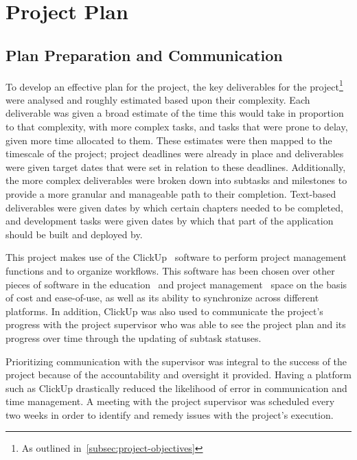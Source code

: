 
\thispagestyle{plain}
\newpage
\section{Project Plan}\label{sec:project-plan}

\normalsize

\subsection{Plan Preparation and Communication}\label{subsec:plan-preparation-and-communication}

To develop an effective plan for the project, the key deliverables for the project\footnote{As outlined in~\ref{subsec:project-objectives}} were analysed and roughly estimated based upon their complexity.
Each deliverable was given a broad estimate of the time this would take in proportion to that complexity, with more complex tasks, and tasks that were prone to delay, given more time allocated to them.
These estimates were then mapped to the timescale of the project;
project deadlines were already in place and deliverables were given target dates that were set in relation to these deadlines.
Additionally, the more complex deliverables were broken down into subtasks and milestones to provide a more granular and manageable path to their completion.
Text-based deliverables were given dates by which certain chapters needed to be completed, and development tasks were given dates by which that part of the application should be built and deployed by.

This project makes use of the ClickUp~\citep{clickup} software to perform project management functions and to organize workflows.
This software has been chosen over other pieces of software in the education~\citep{education_software} and project management~\citep{pm_software} space on the basis of cost and ease-of-use, as well as its ability to synchronize across different platforms.
In addition, ClickUp was also used to communicate the project's progress with the project supervisor who was able to see the project plan and its progress over time through the updating of subtask statuses.

Prioritizing communication with the supervisor was integral to the success of the project because of the accountability and oversight it provided.
Having a platform such as ClickUp drastically reduced the likelihood of error in communication and time management.
A meeting with the project supervisor was scheduled every two weeks in order to identify and remedy issues with the project's execution.


